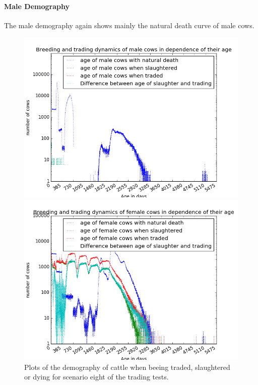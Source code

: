 \paragraph{Male Demography}
The male demography again shows mainly the natural death curve of male cows. 
\begin{figure}[htbp]
\begin{minipage}{0.5\textwidth}
\centering
\noindent\includegraphics[width=0.9\linewidth,height=\textheight,
keepaspectratio]{scen8maleDemography.png} 
\end{minipage}
\begin{minipage}{0.5\textwidth}
\centering
\noindent\includegraphics[width=0.9\linewidth,height=\textheight,
keepaspectratio]{scen8femaleDemography.png} 
\end{minipage}
\caption[Demography in Scenario 8]{Plots of the demography of cattle when beeing traded, slaughtered or dying for scenario eight of the trading tests.}
\label{fig:demographyScen8}
\end{figure} 
